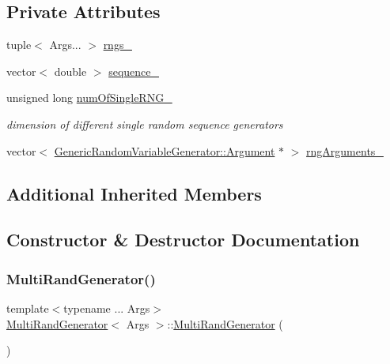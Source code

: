 \subsection*{Private Attributes}
\begin{DoxyCompactItemize}
\item 
tuple$<$ Args... $>$ \hyperlink{class_multi_rand_generator_a531c3ee630241e7c43b0e3fce70850b1}{rngs\+\_\+}
\item 
vector$<$ double $>$ \hyperlink{class_multi_rand_generator_a9a4e23b864633276d73890b770736edd}{sequence\+\_\+}
\item 
unsigned long \hyperlink{class_multi_rand_generator_a31ad84bf3f1e2c7db54b563945801b75}{num\+Of\+Single\+R\+N\+G\+\_\+}
\begin{DoxyCompactList}\small\item\em dimension of different single random sequence generators \end{DoxyCompactList}\item 
vector$<$ \hyperlink{class_generic_random_variable_generator_1_1_argument}{Generic\+Random\+Variable\+Generator\+::\+Argument} $\ast$ $>$ \hyperlink{class_multi_rand_generator_a267533dce301acea01978671fa3cb72f}{rng\+Arguments\+\_\+}
\end{DoxyCompactItemize}
\subsection*{Additional Inherited Members}


\subsection{Constructor \& Destructor Documentation}
\hypertarget{class_multi_rand_generator_abf466c4d24a1c565abe493b26926f3c1}{}\label{class_multi_rand_generator_abf466c4d24a1c565abe493b26926f3c1} 
\subsubsection{\texorpdfstring{Multi\+Rand\+Generator()}{MultiRandGenerator()}}
{\footnotesize\ttfamily template$<$typename ... Args$>$ \\
\hyperlink{class_multi_rand_generator}{Multi\+Rand\+Generator}$<$ Args $>$\+::\hyperlink{class_multi_rand_generator}{Multi\+Rand\+Generator} (\begin{DoxyParamCaption}{ }\end{DoxyParamCaption})\hspace{0.3cm}{\ttfamily [inline]}}



